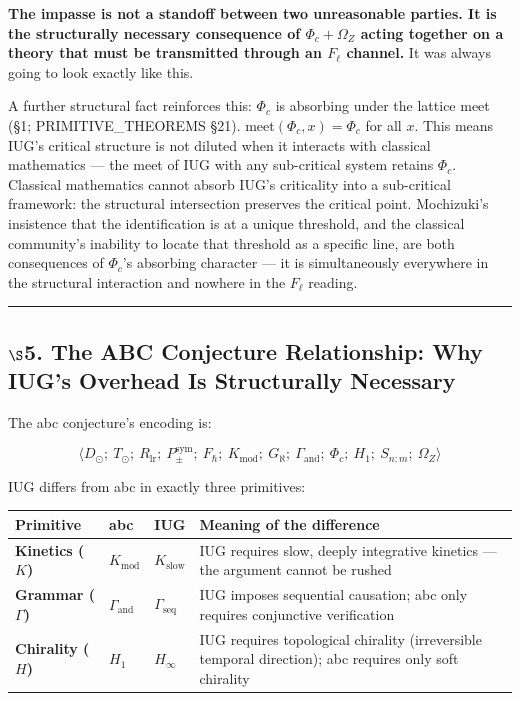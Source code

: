 \documentclass[10pt,a4paper]{article}
\newcommand{\pilcrow}{\S}
\begin{document}
\textbf{The impasse is not a standoff between two unreasonable parties.
It is the structurally necessary consequence of $\Phi_c + \Omega_Z$ acting together
on a theory that must be transmitted through an $F_{\ell}$ channel.}
It was always going to look exactly like this.

A further structural fact reinforces this: $\Phi_c$ is absorbing under the lattice meet
(\S1; PRIMITIVE\_THEOREMS \pilcrow{}21).
$\text{meet}(\Phi_c, x) = \Phi_c$ for all $x$.
This means IUG's critical structure is not diluted when it interacts with classical
mathematics --- the meet of IUG with any sub-critical system retains $\Phi_c$.
Classical mathematics cannot absorb IUG's criticality into a sub-critical framework:
the structural intersection preserves the critical point.
Mochizuki's insistence that the identification is at a unique threshold, and the
classical community's inability to locate that threshold as a specific line,
are both consequences of $\Phi_c$'s absorbing character --- it is simultaneously
everywhere in the structural interaction and nowhere in the $F_{\ell}$ reading.

\begin{center}
\rule{0.5\textwidth}{0.4pt}
\end{center}

\subsection{$\S$5. The ABC Conjecture Relationship: Why IUG's Overhead Is Structurally Necessary}

The abc conjecture's encoding is:


{\small\[\langle D_\odot;\ T_\odot;\ R_\text{lr};\ P_{\pm}^{\text{sym}};\ F_{\hbar};\ K_\text{mod};\ G_{\aleph};\ \Gamma_\text{and};\ \Phi_c;\ H_1;\ S_{n:m};\ \Omega_Z \rangle\]}

IUG differs from abc in exactly three primitives:

\begin{table}[htbp]
\centering
\small
{}
\begin{tabularx}{\textwidth}{>{\centering\arraybackslash}X >{\centering\arraybackslash}X >{\centering\arraybackslash}X >{\centering\arraybackslash}X}
\toprule
\rowcolor{gray!25}\textbf{Primitive} & \textbf{abc} & \textbf{IUG} & \textbf{Meaning of the difference} \\
\midrule
\rowcolors{1}{white}{gray!10}
\textbf{Kinetics ($K$)} & $K_\text{mod}$ & $K_\text{slow}$ & IUG requires slow, deeply integrative kinetics --- the argument cannot be rushed \\
\textbf{Grammar ($\Gamma$)} & $\Gamma_\text{and}$ & $\Gamma_\text{seq}$ & IUG imposes sequential causation; abc only requires conjunctive verification \\
\textbf{Chirality ($H$)} & $H_1$ & $H_{\infty}$ & IUG requires topological chirality (irreversible temporal direction); abc requires only soft chirality \\
\bottomrule
\end{tabularx}
\end{table}
\end{document}
